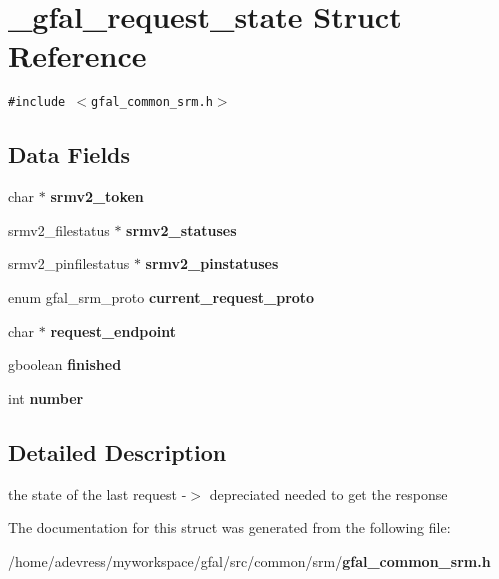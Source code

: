 \section{\_\-gfal\_\-request\_\-state Struct Reference}
\label{struct__gfal__request__state}
{\tt \#include $<$gfal\_\-common\_\-srm.h$>$}

\subsection*{Data Fields}
\begin{CompactItemize}
\item 
char $\ast$ \textbf{srmv2\_\-token}\label{struct__gfal__request__state_fb894137417d237a47ad4fe38a3acede}

\item 
srmv2\_\-filestatus $\ast$ \textbf{srmv2\_\-statuses}\label{struct__gfal__request__state_dd7a800ece5d4f08656d6ebb399d333b}

\item 
srmv2\_\-pinfilestatus $\ast$ \textbf{srmv2\_\-pinstatuses}\label{struct__gfal__request__state_882d10ccee4ae1a8a639cde3584b9ac9}

\item 
enum gfal\_\-srm\_\-proto \textbf{current\_\-request\_\-proto}\label{struct__gfal__request__state_e5053321643c3fc69f4a6d13878eed1a}

\item 
char $\ast$ \textbf{request\_\-endpoint}\label{struct__gfal__request__state_9125ea45c8376bf0d5e960726319934e}

\item 
gboolean \textbf{finished}\label{struct__gfal__request__state_71c0a480bb4277273a43d9b18af07929}

\item 
int \textbf{number}\label{struct__gfal__request__state_c09e0133946fddd499f424d21a87a65b}

\end{CompactItemize}


\subsection{Detailed Description}
the state of the last request -$>$ depreciated needed to get the response 



The documentation for this struct was generated from the following file:\begin{CompactItemize}
\item 
/home/adevress/myworkspace/gfal/src/common/srm/\bf{gfal\_\-common\_\-srm.h}\end{CompactItemize}
